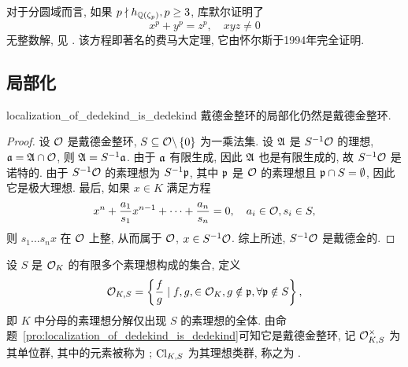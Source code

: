 对于分圆域而言, 如果 $p\nmid h_{{\mathbb{Q}}(\zeta_p)},p\ge 3$, 库默尔证明了
  \[x^p+y^p=z^p,\quad xyz\neq 0\]
无整数解, 见 \cite[Chapter 1]{Lang1990}. 该方程即著名的费马大定理, 它由怀尔斯\cite{TaylorWiles1995, Wiles1995}于1994年完全证明.



\subsection{局部化}
\begin{proposition}{}{localization_of_dedekind_is_dedekind}
戴德金整环的局部化仍然是戴德金整环.
\end{proposition}
\begin{proof}
设 ${\mathcal{O}}$ 是戴德金整环, $S\subseteq {\mathcal{O}}\backslash\left\{0\right\}$ 为一乘法集. 设 ${\mathfrak{A}}$ 是 $S^{-1}{\mathcal{O}}$ 的理想, ${\mathfrak{a}}={\mathfrak{A}}\cap{\mathcal{O}}$, 则 ${\mathfrak{A}}=S^{-1}{\mathfrak{a}}$. 由于 ${\mathfrak{a}}$ 有限生成, 因此 ${\mathfrak{A}}$ 也是有限生成的, 故 $S^{-1}{\mathcal{O}}$ 是诺特的. 由于 $S^{-1}{\mathcal{O}}$ 的素理想为 $S^{-1}{\mathfrak{p}}$, 其中 ${\mathfrak{p}}$ 是 ${\mathcal{O}}$ 的素理想且 ${\mathfrak{p}}\cap S=\emptyset$, 因此它是极大理想. 最后, 如果 $x\in K$ 满足方程
	\[x^n+\frac{a_1}{s_1}x^{n-1}+\cdots+\frac{a_n}{s_n}=0,\quad a_i\in{\mathcal{O}},s_i\in S,\]
则 $s_1\dots s_n x$ 在 ${\mathcal{O}}$ 上整, 从而属于 ${\mathcal{O}}$, $x\in S^{-1}{\mathcal{O}}$. 综上所述, $S^{-1}{\mathcal{O}}$ 是戴德金的.
\end{proof}


设 $S$ 是 ${\mathcal{O}}_K$ 的有限多个素理想构成的集合, 定义
	\[{\mathcal{O}}_{K,S}=\left\{\frac{f}{g}\mid f,g,\in{\mathcal{O}}_K,g\notin{\mathfrak{p}},\forall {\mathfrak{p}}\notin S\right\},\]
即 $K$ 中分母的素理想分解仅出现 $S$ 的素理想的全体. 由命题~\ref{pro:localization_of_dedekind_is_dedekind}可知它是戴德金整环, 记 ${\mathcal{O}}_{K,S}^\times$ 为其单位群, 其中的元素被称为 ; ${\mathrm{Cl}}_{K,S}$ 为其理想类群, 称之为 .

